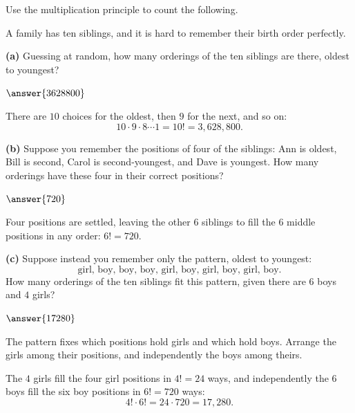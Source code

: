 \documentclass[12pt]{ximera}
\begin{document}
\begin{problem}
Use the multiplication principle to count the following.

A family has ten siblings, and it is hard to remember their birth order perfectly.

\begin{prompt}
\textbf{(a)} Guessing at random, how many orderings of the ten siblings are there,
oldest to youngest?

$\answer{3628800}$

\begin{feedback}
There are $10$ choices for the oldest, then $9$ for the next, and so on:
\[ 10\cdot 9\cdot 8\cdots 1 = 10! = 3{,}628{,}800. \]
\end{feedback}
\end{prompt}

\begin{prompt}
\textbf{(b)} Suppose you remember the positions of four of the siblings: Ann is oldest,
Bill is second, Carol is second-youngest, and Dave is youngest. How many orderings
have these four in their correct positions?

$\answer{720}$

\begin{feedback}
Four positions are settled, leaving the other $6$ siblings to fill the $6$ middle
positions in any order: $6! = 720$.
\end{feedback}
\end{prompt}

\begin{prompt}
\textbf{(c)} Suppose instead you remember only the pattern, oldest to youngest:
\[
\text{girl, boy, boy, boy, girl, boy, girl, boy, girl, boy}.
\]
How many orderings of the ten siblings fit this pattern, given there are $6$ boys and
$4$ girls?

$\answer{17280}$

\begin{hint}
The pattern fixes which positions hold girls and which hold boys. Arrange the girls
among their positions, and independently the boys among theirs.
\end{hint}

\begin{feedback}
The $4$ girls fill the four girl positions in $4!=24$ ways, and independently the $6$
boys fill the six boy positions in $6!=720$ ways:
\[ 4!\cdot 6! = 24\cdot 720 = 17{,}280. \]
\end{feedback}
\end{prompt}
\end{problem}
\end{document}

